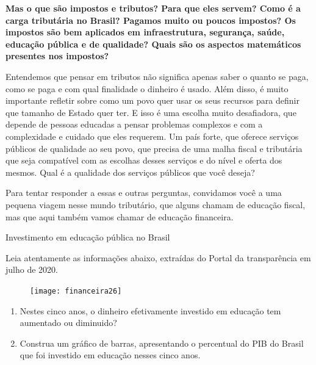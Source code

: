 \textbf{Mas o que são impostos e tributos? Para que eles servem? Como é a carga tributária no Brasil? Pagamos muito ou poucos impostos? Os impostos são bem aplicados em infraestrutura, segurança, saúde, educação pública e de qualidade? Quais são os aspectos matemáticos presentes nos impostos?}

Entendemos que pensar em tributos não significa apenas saber o quanto se paga, como se paga e com qual finalidade o dinheiro é usado. Além disso, é muito importante refletir sobre como um povo quer usar os seus recursos para definir que tamanho de Estado quer ter. E isso é uma escolha muito desafiadora, que depende de pessoas educadas a pensar problemas complexos e com a complexidade e cuidado que eles requerem. Um país forte, que oferece serviços públicos de qualidade ao seu povo, que precisa de uma malha fiscal e tributária que seja compatível com as escolhas desses serviços e do nível e oferta dos mesmos. Qual é a qualidade dos serviços públicos que você deseja?

Para tentar responder a essas e outras perguntas, convidamos você a uma pequena viagem nesse mundo tributário, que alguns chamam de educação fiscal, mas que aqui também vamos chamar de educação financeira.

\begin{task}{Investimento em educação pública no Brasil}
\label{fin-ativ-35}


Leia atentamente as informações abaixo, extraídas do Portal da transparência em julho de 2020.

\begin{figure}[H]
\centering

\texttt{[image: financeira26]}
\end{figure}

\begin{enumerate}
  \item Nestes cinco anos, o dinheiro efetivamente investido em educação tem aumentado ou diminuido?
  \item Construa um gráfico de barras, apresentando o percentual do PIB do Brasil que foi investido em educação nesses cinco anos.
\end{enumerate}

\end{task}

